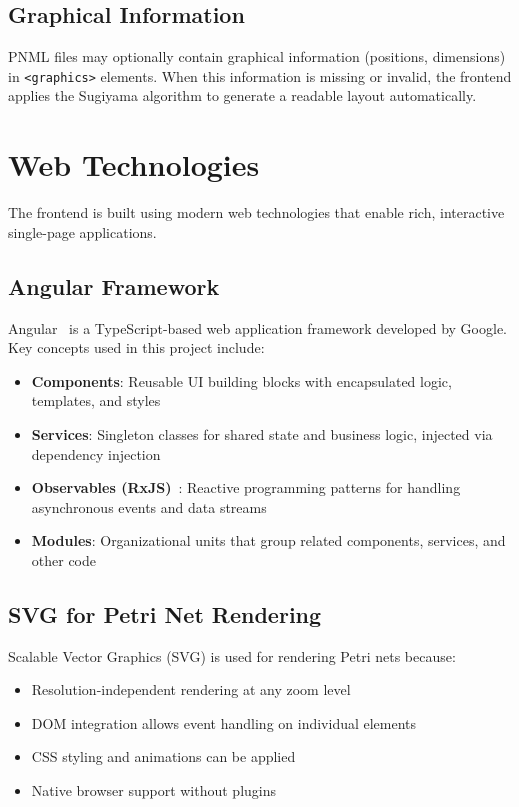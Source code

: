 \subsection{Graphical Information}

PNML files may optionally contain graphical information (positions, dimensions) in \texttt{<graphics>} elements. When this information is missing or invalid, the frontend applies the Sugiyama algorithm to generate a readable layout automatically.

\section{Web Technologies}
\label{sec:web-technologies}

The frontend is built using modern web technologies that enable rich, interactive single-page applications.

\subsection{Angular Framework}

Angular~\cite{AngularDocs} is a TypeScript-based web application framework developed by Google. Key concepts used in this project include:

\begin{itemize}
    \item \textbf{Components}: Reusable UI building blocks with encapsulated logic, templates, and styles
    \item \textbf{Services}: Singleton classes for shared state and business logic, injected via dependency injection
    \item \textbf{Observables (RxJS)}~\cite{RxJS}: Reactive programming patterns for handling asynchronous events and data streams
    \item \textbf{Modules}: Organizational units that group related components, services, and other code
\end{itemize}

\subsection{SVG for Petri Net Rendering}

Scalable Vector Graphics (SVG) is used for rendering Petri nets because:
\begin{itemize}
    \item Resolution-independent rendering at any zoom level
    \item DOM integration allows event handling on individual elements
    \item CSS styling and animations can be applied
    \item Native browser support without plugins
\end{itemize}

